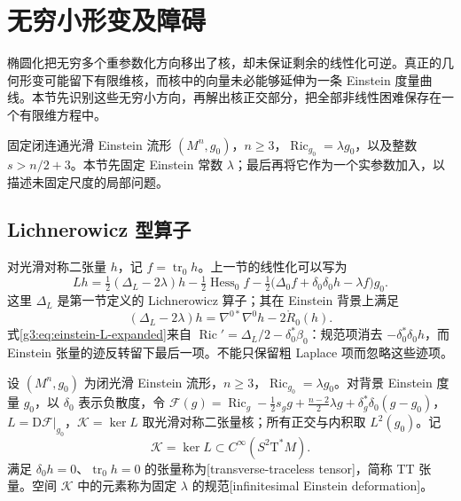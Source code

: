 
% 
% 

\section{无穷小形变及障碍}
\label{g3:sec:2503}

椭圆化把无穷多个重参数化方向移出了核，却未保证剩余的线性化可逆。真正的几何形变可能留下有限维核，而核中的向量未必能够延伸为一条 Einstein 度量曲线。本节先识别这些无穷小方向，再解出核正交部分，把全部非线性困难保存在一个有限维方程中。

固定闭连通光滑 Einstein 流形 \((M^n,g_0)\)，\(n\ge3\)，\(\operatorname{Ric}_{g_0}=\lambda g_0\)，以及整数 \(s>n/2+3\)。本节先固定 Einstein 常数 \(\lambda\)；最后再将它作为一个实参数加入，以描述未固定尺度的局部问题。

\subsection{Lichnerowicz 型算子}
\label{g3:subsec:2503:01}
对光滑对称二张量 \(h\)，记 \(f=\operatorname{tr}_0h\)。上一节的线性化可以写为
\begin{equation}\label{g3:eq:einstein-L-expanded}
	Lh=\tfrac12(\Delta_L-2\lambda)h
	-\tfrac12\operatorname{Hess}_0 f
	-\tfrac12\bigl(\Delta_0f+\delta_0\delta_0h-\lambda f\bigr)g_0.
\end{equation}
这里 \(\Delta_L\) 是第一节定义的 Lichnerowicz 算子；其在 Einstein 背景上满足
\[
	(\Delta_L-2\lambda)h=\nabla^{0*}\nabla^0h-2\mathring R_0(h).
\]
式\eqref{g3:eq:einstein-L-expanded}来自 \(\operatorname{Ric}'=\Delta_L/2-\delta_0^*\beta_0\)：规范项消去 \(-\delta_0^*\delta_0h\)，而 Einstein 张量的迹反转留下最后一项。不能只保留粗 Laplace 项而忽略这些迹项。

\begin{definition}\label{g3:def:einstein-infinitesimal-space}
	设 \((M^n,g_0)\) 为闭光滑 Einstein 流形，\(n\ge3\)，\(\operatorname{Ric}_{g_0}=\lambda g_0\)。对背景 Einstein 度量 \(g_0\)，以 \(\delta_0\) 表示负散度，令 \(\mathcal F(g)=\operatorname{Ric}_g-\tfrac12s_gg+\tfrac{n-2}2\lambda g+\delta_g^*\delta_0(g-g_0)\)，\(L=\mathrm D\mathcal F|_{g_0}\)，\(\mathcal K=\ker L\) 取光滑对称二张量核；所有正交与内积取 \(L^2(g_0)\)。记
	\[
		\mathcal K=\ker L\subset C^\infty(S^2\mathrm T^*M).
	\]
	满足 \(\delta_0h=0\)、\(\operatorname{tr}_0h=0\) 的张量称为[transverse-traceless tensor]，简称 TT 张量。空间 \(\mathcal K\) 中的元素称为固定 \(\lambda\) 的规范[infinitesimal Einstein deformation]。
\end{definition}

